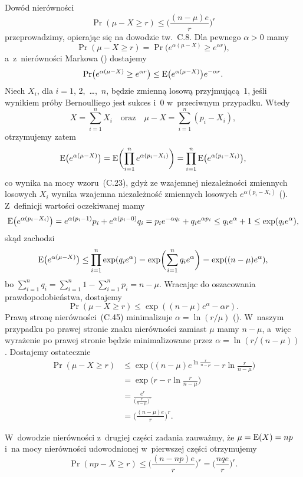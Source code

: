 \exercise %
Dowód nierówności
\[
    \Pr(\mu-X\ge r) \le \biggl(\frac{(n-\mu)e}{r}\biggr)^r
\]
przeprowadzimy, opierając się na dowodzie tw.~C.8. Dla pewnego $\alpha>0$ mamy
\[
	\Pr(\mu-X\ge r) = \Pr\bigl(e^{\alpha(\mu-X)}\ge e^{\alpha r}\bigr),
\]
a~z~nierówności Markowa () dostajemy
\[
	\Pr\bigl(e^{\alpha(\mu-X)}\ge e^{\alpha r}\bigr) \le \operatorname{E}\bigl(e^{\alpha(\mu-X)}\bigr)e^{-\alpha r}.
\]
Niech $X_i$, dla $i=1$, 2,~\dots,~$n$, będzie zmienną losową przyjmującą~1, jeśli wynikiem  próby Bernoulliego jest sukces i~0 w~przeciwnym przypadku. Wtedy
\[
	X = \sum_{i=1}^nX_i \quad\text{oraz}\quad \mu-X = \sum_{i=1}^n(p_i-X_i),
\]
otrzymujemy zatem
\[
	\operatorname{E}\bigl(e^{\alpha(\mu-X)}\bigr) = \operatorname{E}\biggl(\prod_{i=1}^ne^{\alpha(p_i-X_i)}\biggr) = \prod_{i=1}^n\operatorname{E}\bigl(e^{\alpha(p_i-X_i)}\bigr),
\]
co wynika na mocy wzoru~(C.23), gdyż ze wzajemnej niezależności zmiennych losowych $X_i$ wynika wzajemna niezależność zmiennych losowych $e^{\alpha(p_i-X_i)}$ (). Z~definicji wartości oczekiwanej mamy
\[
	\operatorname{E}\bigl(e^{\alpha(p_i-X_i)}\bigr) = e^{\alpha(p_i-1)}p_i+e^{\alpha(p_i-0)}q_i = p_ie^{-\alpha q_i}+q_ie^{\alpha p_i} \le q_ie^{\alpha}+1 \le \exp(q_ie^\alpha),
\]
skąd zachodzi
\[
	\operatorname{E}\bigl(e^{\alpha(\mu-X)}\bigr) \le \prod_{i=1}^n\exp(q_ie^\alpha) = \exp\biggl(\sum_{i=1}^nq_ie^\alpha\biggr) = \exp((n-\mu)e^\alpha),
\]
bo $\sum_{i=1}^nq_i=\sum_{i=1}^n1-\sum_{i=1}^np_i=n-\mu$. Wracając do oszacowania prawdopodobieństwa, dostajemy
\[
	\Pr(\mu-X\ge r) \le \exp((n-\mu)e^\alpha-\alpha r).
\]
Prawą stronę nierówności~(C.45) minimalizuje $\alpha=\ln(r/\mu)$ (). W~naszym przypadku po prawej stronie znaku nierówności zamiast $\mu$ mamy $n-\mu$, a~więc wyrażenie po prawej stronie będzie minimalizowane przez $\alpha=\ln(r/(n-\mu))$. Dostajemy ostatecznie
\begin{align*}
	\Pr(\mu-X\ge r) &\le \exp\biggl((n-\mu)e^{\ln\frac{r}{n-\mu}}-r\ln\frac{r}{n-\mu}\biggr) \\
	&= \exp\biggl(r-r\ln\frac{r}{n-\mu}\biggr) \\
	&= \frac{e^r}{\bigl(\frac{r}{n-\mu}\bigr)^r} \\
	&= \biggl(\frac{(n-\mu)e}{r}\biggr)^r.
\end{align*}

W~dowodzie nierówności z~drugiej części zadania zauważmy, że $\mu=\operatorname{E}(X)=np$ i~na mocy nierówności udowodnionej w~pierwszej części otrzymujemy
\[
    \Pr(np-X\ge r) \le \biggl(\frac{(n-np)e}{r}\biggr)^r = \biggl(\frac{nqe}{r}\biggr)^r.
\]


